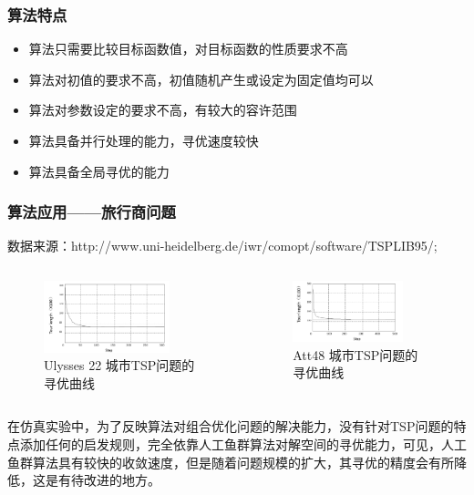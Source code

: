 \begin{frame}
	\frametitle{算法特点}
	\begin{itemize}
		\item{算法只需要比较目标函数值，对目标函数的性质要求不高}
		\item{算法对初值的要求不高，初值随机产生或设定为固定值均可以}
		\item{算法对参数设定的要求不高，有较大的容许范围}
		\item{算法具备并行处理的能力，寻优速度较快}
		\item{算法具备全局寻优的能力}
	\end{itemize}
\end{frame}
\begin{frame}
	\frametitle{算法应用——旅行商问题}	
	\small{数据来源：http://www.uni-heidelberg.de/iwr/comopt/software/TSPLIB95/;}
	\begin{columns}
		\begin{figure}
			\centering
			\includegraphics[width=0.8\textwidth]{pic/fish4.png}
			\caption{Ulysses 22 城市TSP问题的寻优曲线}
		\end{figure}
		\begin{figure}
			\centering
			\includegraphics[width=0.8\textwidth]{pic/fish5.png}
			\caption{Att48 城市TSP问题的寻优曲线}
		\end{figure}
	\end{columns}
	\small{在仿真实验中，为了反映算法对组合优化问题的解决能力，没有针对TSP问题的特点添加任何的启发规则，完全依靠人工鱼群算法对解空间的寻优能力，可见，人工鱼群算法具有较快的收敛速度，但是随着问题规模的扩大，其寻优的精度会有所降低，这是有待改进的地方。}
	
\end{frame}

